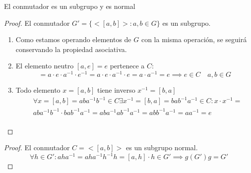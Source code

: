 \begin{thm}
    El conmutador es un subgrupo y es normal
\end{thm}

\begin{proof}
    El conmutador $G' = \{<[a,b]> : a,b \in G\}$ es un subgrupo.
    \begin{enumerate}
        \item Como estamos operando elementos de $G$ con la misma operación, se seguirá conservando la propiedad asociativa.
        \item El elemento neutro $[a,e] = e$ pertenece a $C$:
            \begin{equation}
                [a,e] = a\cdot e\cdot a^{-1} \cdot e^{-1} = a \cdot e \cdot a^{-1} \cdot e = a \cdot a^{-1} = e \implies e \in C \quad a,b \in G
            \end{equation}
        \item Todo elemento $x = [a,b]$ tiene inverso $x^{-1} = [b,a]$
            \begin{equation}
                \begin{split}
                    & \forall x = [a,b] = aba^{-1}b^{-1} \in C \exists x^{-1} = [b,a] = bab^{-1}a^{-1} \in C : x \cdot x^{-1} =\\
                    & aba^{-1}b^{-1} \cdot bab^{-1}a^{-1} = aba^{-1}ab^{-1}a^{-1} = abb^{-1}a^{-1} = aa^{-1} = e\\   
                \end{split}
            \end{equation}
    \end{enumerate}
\end{proof}

\begin{proof}
    El conmutador $C = <[a,b]>$ es un subgrupo normal.
    \begin{equation}
        \forall h \in G' : aha^{-1} = aha^{-1}h^{-1}h = [a, h] \cdot h \in G' \implies g(G')g = G'
    \end{equation}
\end{proof}

